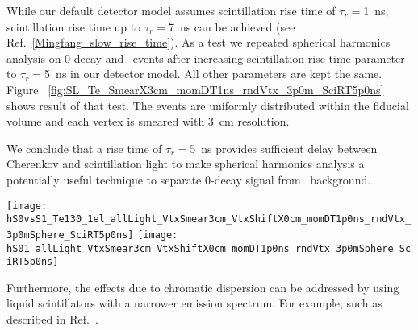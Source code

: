While our default detector model assumes scintillation rise time of $\tau_r=$1~ns, scintillation rise time up to $\tau_r=$7~ns can 
be achieved (see Ref.~\ref{Mingfang_slow_rise_time}). As a test we repeated spherical harmonics analysis on 0\nbb-decay and \B~events after
increasing scintillation rise time parameter to $\tau_r=$5~ns in our detector model. All other parameters are kept the same.
Figure ~\ref{fig:SL_Te_SmearX3cm_momDT1ns_rndVtx_3p0m_SciRT5p0ns} shows result of that test. The events are uniformly distributed within 
the fiducial volume and each vertex is smeared with 3~cm resolution. 

We conclude that a rise time of $\tau_r=$5~ns provides sufficient delay between
Cherenkov and scintillation light to make spherical harmonics analysis a potentially useful technique to separate 
0\nbb-decay signal from \B~background.

\begin{figure*}[h]
  \centering
  \texttt{[image: hS0vsS1\_Te130\_1el\_allLight\_VtxSmear3cm\_VtxShiftX0cm\_momDT1p0ns\_rndVtx\_3p0mSphere\_SciRT5p0ns]} 
  \texttt{[image: hS01\_allLight\_VtxSmear3cm\_VtxShiftX0cm\_momDT1p0ns\_rndVtx\_3p0mSphere\_SciRT5p0ns]}
  \caption{Scintillation rise time constant is increased to $\tau_r=$5~ns compared to $\tau_r=$1~ns in the default detector model.
    \emph{Left:} Scatter plot of $S_0$ versus $S_1$ for a simulation of 1000 signal (\emph{red crosses}) and background
    (\emph{blue triangles}) events. Event verticies are uniformly distributed within the fiducial volume, $R<3$~m.
    Vertex is smeared with 3~cm resolution. Differential cut of
    $\Delta t=t^{phot}_{measured} - t^{phot}_{predicted}<$1~ns is applied to select early PE sample.
    The default QE and 100\% photo-coverage is used in the simulation.
    Black dashed line corresponds to a linear fit to define 1-D variable $S_{01}$ (see text for details).
    \emph{Right:} Comparison of the $S_{01}$ distribution between signal (\emph{red solid line}) and background (\emph{blue dashed line}).}
\label{fig:SL_Te_SmearX3cm_momDT1ns_rndVtx_3p0m_SciRT5p0ns}
\end{figure*}


Furthermore, the effects due to chromatic dispersion can be addressed by using liquid scintillators with a narrower emission spectrum. For example,
such as described in Ref.~\cite{LS_narrow_emission}.





